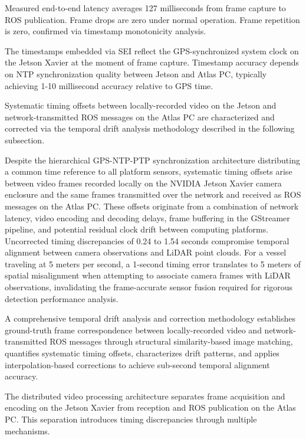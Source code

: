 \documentclass{erauthesis}
\begin{document}
Measured end-to-end latency averages 127 milliseconds from frame capture to ROS publication.
Frame drops are zero under normal operation.
Frame repetition is zero, confirmed via timestamp monotonicity analysis.

The timestamps embedded via SEI reflect the GPS-synchronized system clock on the Jetson Xavier at the moment of frame capture.
Timestamp accuracy depends on NTP synchronization quality between Jetson and Atlas PC, typically achieving 1-10 millisecond accuracy relative to GPS time.

Systematic timing offsets between locally-recorded video on the Jetson and network-transmitted ROS messages on the Atlas PC are characterized and corrected via the temporal drift analysis methodology described in the following subsection.


Despite the hierarchical GPS-NTP-PTP synchronization architecture distributing a common time reference to all platform sensors, systematic timing offsets arise between video frames recorded locally on the NVIDIA Jetson Xavier camera enclosure and the same frames transmitted over the network and received as ROS messages on the Atlas PC.
These offsets originate from a combination of network latency, video encoding and decoding delays, frame buffering in the GStreamer pipeline, and potential residual clock drift between computing platforms.
Uncorrected timing discrepancies of 0.24 to 1.54 seconds compromise temporal alignment between camera observations and LiDAR point clouds.
For a vessel traveling at 5 meters per second, a 1-second timing error translates to 5 meters of spatial misalignment when attempting to associate camera frames with LiDAR observations, invalidating the frame-accurate sensor fusion required for rigorous detection performance analysis.

A comprehensive temporal drift analysis and correction methodology establishes ground-truth frame correspondence between locally-recorded video and network-transmitted ROS messages through structural similarity-based image matching, quantifies systematic timing offsets, characterizes drift patterns, and applies interpolation-based corrections to achieve sub-second temporal alignment accuracy.


The distributed video processing architecture separates frame acquisition and encoding on the Jetson Xavier from reception and ROS publication on the Atlas PC.
This separation introduces timing discrepancies through multiple mechanisms.
\end{document}
